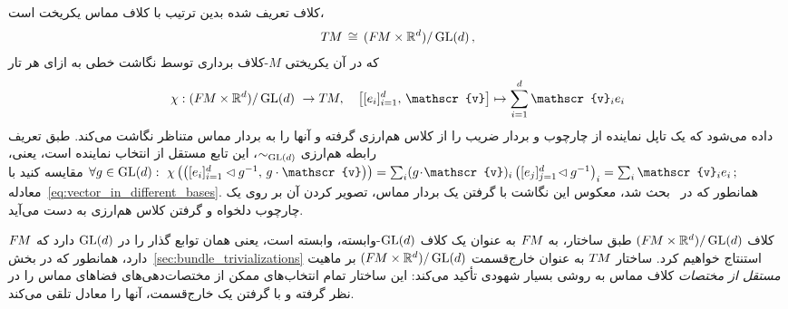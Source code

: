 کلاف تعریف شده بدین ترتیب با کلاف مماس یکریخت است،
\begin{align}
	T\mkern-1.5muM\, \cong\, (F\mkern-1.5muM\times\mathbb{R}^d)/\operatorname{GL}(d) \,,
\end{align}
که در آن یکریختی $M$-کلاف برداری توسط نگاشت خطی به ازای هر تار
\begin{align}\label{eq:A_TM_isomorphism}
	\chi:(\FM\times\R^d)/\GL{d}\ \to \TM,\ \ \ \left[[e_i]_{i=1}^d,\, \mathscr{v}\right] \mapsto \sum_{i=1}^d \mathscr{v}_i e_i
\end{align}
داده می‌شود که یک تاپل نماینده از چارچوب و بردار ضریب را از کلاس هم‌ارزی گرفته و آنها را به بردار مماس متناظر نگاشت می‌کند.
طبق تعریف رابطه هم‌ارزی $\sim_{\operatorname{GL}(d)}$، این تابع مستقل از انتخاب نماینده است، یعنی،
$
\forall g\in \GL{d}: \ 
\chi\left( \big([e_i]_{i=1}^d\lhd g^{-1},\, g\cdot \mathscr{v}\big) \right) = 
{\sum_i (g\!\cdot\!\mathscr{v})_i \left([e_j]_{j=1}^d\!\lhd g^{-1}\right)_i} =
\sum_i \mathscr{v}_i e_i \, ;\,
$
مقایسه کنید با معادله~\eqref{eq:vector_in_different_bases}.
همانطور که در~\cite{schullerGeometricalAnatomy2016} بحث شد، معکوس این نگاشت با گرفتن یک بردار مماس، تصویر کردن آن بر روی یک چارچوب دلخواه و گرفتن کلاس هم‌ارزی به دست می‌آید.


کلاف $(F\mkern-1.5muM \times \mathbb{R}^d) / \operatorname{GL}(d)$ طبق ساختار، به $F\mkern-1.5muM$ به عنوان یک کلاف $\operatorname{GL}(d)$-وابسته، وابسته است، یعنی همان توابع گذار را در $\operatorname{GL}(d)$ دارد که $F\mkern-1.5muM$ دارد، همانطور که در بخش~\ref{sec:bundle_trivializations} استنتاج خواهیم کرد.
ساختار $T\mkern-1.5muM$ به عنوان خارج‌قسمت $(F\mkern-1.5muM\times\mathbb{R}^d)/\operatorname{GL}(d)$ بر ماهیت \emph{مستقل از مختصات} کلاف مماس به روشی بسیار شهودی تأکید می‌کند:
این ساختار تمام انتخاب‌های ممکن از مختصات‌دهی‌های فضاهای مماس را در نظر گرفته و با گرفتن یک خارج‌قسمت، آنها را معادل تلقی می‌کند.